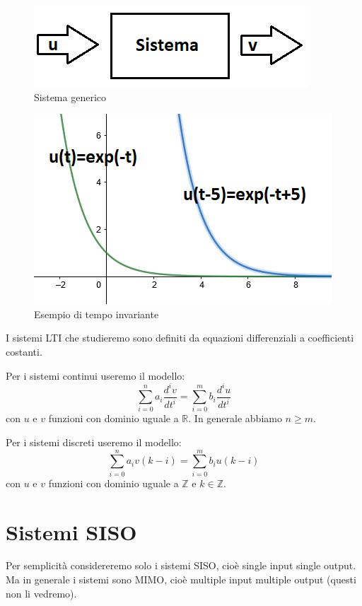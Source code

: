 \begin{figure}[h]
	\centering
	\includegraphics[width=0.7\linewidth]{immagini/sistema2}
	\caption{ Sistema generico }
	\label{fig:sistema2}
\end{figure}

\begin{figure}[h]
	\centering
	\includegraphics[width=0.7\linewidth]{immagini/esponenziale}
	\caption{ Esempio di tempo invariante }
	\label{fig:esponenziale}
\end{figure}

\pagebreak

I sistemi LTI che studieremo sono definiti da equazioni differenziali a coefficienti costanti.

Per i sistemi continui useremo il modello:
\begin{equation*}
\sum\limits_{i=0}^n a_{i} \frac{ d^{i} v }{ dt^{i}  } = \sum\limits_{i=0}^m b_{i} \frac{ d^{i} u }{ dt^{i}  }
\tag{1}\label{equation 1}
\end{equation*}
con $u$ e $v$ funzioni con dominio uguale a $\mathbb{R}$. In generale abbiamo $n\geq m$.


Per i sistemi discreti useremo il modello:
\begin{equation*}
\sum\limits_{i=0}^n a_{i} v(k-i) = \sum\limits_{i=0}^m b_{i} u(k-i)
\end{equation*}
con $u$ e $v$ funzioni con dominio uguale a $\mathbb{Z}$ e $ k \in \mathbb{Z} $.

\section{Sistemi SISO}
Per semplicità considereremo solo i sistemi SISO, cioè single input single output. Ma in generale i sistemi sono MIMO, cioè multiple input multiple output (questi non li vedremo).

